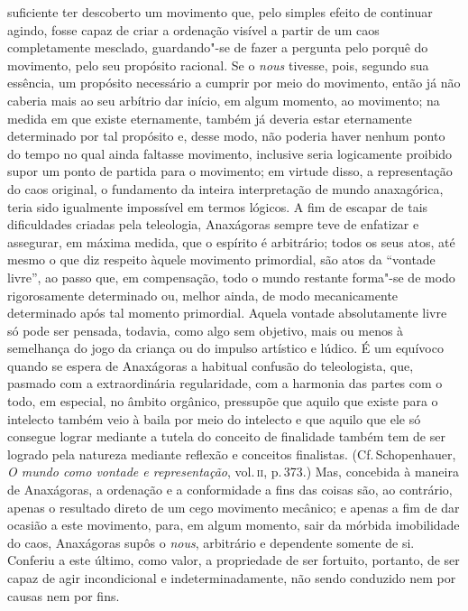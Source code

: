  suficiente ter descoberto um movimento que, pelo simples efeito de continuar
 agindo, fosse capaz de criar a ordenação visível a partir de um caos
 completamente mesclado, guardando"-se de fazer a pergunta pelo porquê do
 movimento, pelo seu propósito racional. Se o \textit{nous} tivesse, pois,
 segundo sua essência, um propósito necessário a cumprir por meio do
 movimento, então já não caberia mais ao seu arbítrio dar início, em algum
 momento, ao movimento; na medida em que existe eternamente, também já
 deveria estar eternamente determinado por tal propósito e, desse modo, não
 poderia haver nenhum ponto do tempo no qual ainda faltasse movimento,
 inclusive seria logicamente proibido supor um ponto de partida para o
 movimento; em virtude disso, a representação do caos original, o fundamento
 da inteira interpretação de mundo anaxagórica, teria sido igualmente
 impossível em termos lógicos. A fim de escapar de tais dificuldades criadas
 pela teleologia, Anaxágoras sempre teve de enfatizar e assegurar, em máxima
 medida, que o espírito é arbitrário; todos os seus atos, até mesmo o que diz
 respeito àquele movimento primordial, são atos da ``vontade livre'', ao
 passo que, em compensação, todo o mundo restante forma"-se de modo
 rigorosamente determinado ou, melhor ainda, de modo mecanicamente
 determinado após tal momento primordial. Aquela vontade absolutamente livre
 só pode ser pensada, todavia, como algo sem objetivo, mais ou menos à
 semelhança do jogo da criança ou do impulso artístico e lúdico. É um
 equívoco quando se espera de Anaxágoras a habitual confusão do teleologista,
 que, pasmado com a extraordinária regularidade, com a harmonia das partes
 com o todo, em especial, no âmbito orgânico, pressupõe que aquilo que existe
 para o intelecto também veio à baila por meio do intelecto e que aquilo que
 ele só consegue lograr mediante a tutela do conceito de finalidade também
 tem de ser logrado pela natureza mediante reflexão e conceitos finalistas.
 (Cf.\,Schopenhauer, \textit{O mundo como vontade e representação}, vol.\,\textsc{ii}, 
 p.\,373.) Mas, concebida à maneira de Anaxágoras, a ordenação e a conformidade a fins das
 coisas são, ao contrário, apenas o resultado direto de um cego movimento
 mecânico; e apenas a fim de dar ocasião a este movimento, para, em algum
 momento, sair da mórbida imobilidade do caos, Anaxágoras supôs o \textit{nous}, arbitrário e dependente somente de si. Conferiu a este último, como
 valor, a propriedade de ser fortuito, portanto, de ser capaz de agir
 incondicional e indeterminadamente, não sendo conduzido nem por causas nem
 por fins.


